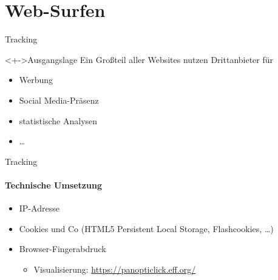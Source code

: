 \section{Web-Surfen}
\begin{frame}{Tracking}
  \begin{block}<+->{Ausgangslage}
    Ein Großteil aller Websites nutzen Drittanbieter für
    \begin{itemize}
      \item Werbung
      \item \glqq Social Media\grqq -Präsenz
      \item statistische Analysen
      \item \ldots
    \end{itemize}
  \end{block}


\end{frame}

\begin{frame}{Tracking}
  \framesubtitle{Technische Umsetzung}
  \begin{itemize}
    \item IP-Adresse
    \item Cookies und Co (HTML5 Persistent Local Storage, Flashcookies, \ldots)
    \item Browser-Fingerabdruck
      \begin{itemize}
        \item Visualisierung: \url{https://panopticlick.eff.org/}
      \end{itemize}
  \end{itemize}
\end{frame}

